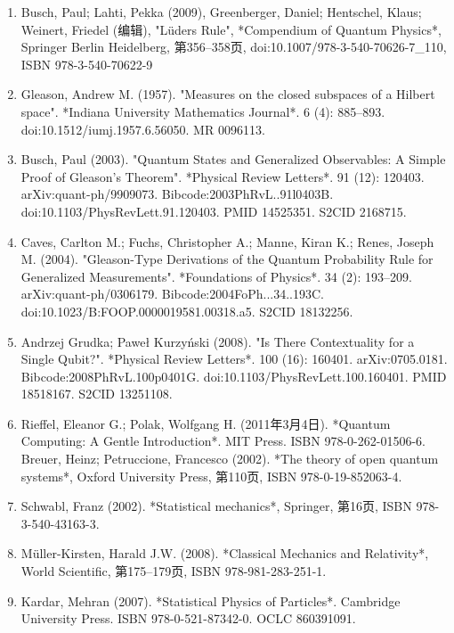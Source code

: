 \begin{enumerate}
\item Busch, Paul; Lahti, Pekka (2009), Greenberger, Daniel; Hentschel, Klaus; Weinert, Friedel (编辑), "Lüders Rule", *Compendium of Quantum Physics*, Springer Berlin Heidelberg, 第356–358页, doi:10.1007/978-3-540-70626-7_110, ISBN 978-3-540-70622-9  
\item Gleason, Andrew M. (1957). "Measures on the closed subspaces of a Hilbert space". *Indiana University Mathematics Journal*. 6 (4): 885–893. doi:10.1512/iumj.1957.6.56050. MR 0096113.  
\item Busch, Paul (2003). "Quantum States and Generalized Observables: A Simple Proof of Gleason's Theorem". *Physical Review Letters*. 91 (12): 120403. arXiv:quant-ph/9909073. Bibcode:2003PhRvL..91l0403B. doi:10.1103/PhysRevLett.91.120403. PMID 14525351. S2CID 2168715.
\item Caves, Carlton M.; Fuchs, Christopher A.; Manne, Kiran K.; Renes, Joseph M. (2004). "Gleason-Type Derivations of the Quantum Probability Rule for Generalized Measurements". *Foundations of Physics*. 34 (2): 193–209. arXiv:quant-ph/0306179. Bibcode:2004FoPh...34..193C. doi:10.1023/B:FOOP.0000019581.00318.a5. S2CID 18132256.  
\item Andrzej Grudka; Paweł Kurzyński (2008). "Is There Contextuality for a Single Qubit?". *Physical Review Letters*. 100 (16): 160401. arXiv:0705.0181. Bibcode:2008PhRvL.100p0401G. doi:10.1103/PhysRevLett.100.160401. PMID 18518167. S2CID 13251108.  
\item Rieffel, Eleanor G.; Polak, Wolfgang H. (2011年3月4日). *Quantum Computing: A Gentle Introduction*. MIT Press. ISBN 978-0-262-01506-6.  
Breuer, Heinz; Petruccione, Francesco (2002). *The theory of open quantum systems*, Oxford University Press, 第110页, ISBN 978-0-19-852063-4.  
\item Schwabl, Franz (2002). *Statistical mechanics*, Springer, 第16页, ISBN 978-3-540-43163-3.  
\item Müller-Kirsten, Harald J.W. (2008). *Classical Mechanics and Relativity*, World Scientific, 第175–179页, ISBN 978-981-283-251-1.  
\item Kardar, Mehran (2007). *Statistical Physics of Particles*. Cambridge University Press. ISBN 978-0-521-87342-0. OCLC 860391091.
\end{enumerate}
